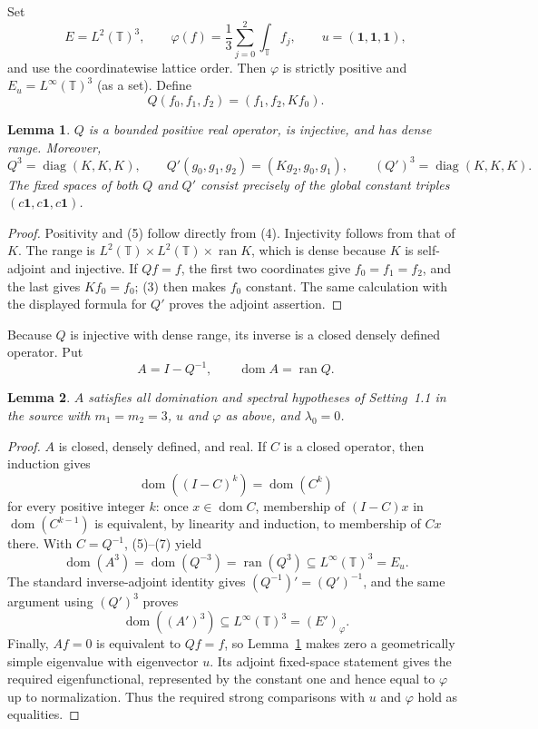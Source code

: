 \documentclass[11pt]{article}
\newtheorem{lemma}{Lemma}
\theoremstyle{remark}
\newcommand{\T}{\mathbb T}
\newcommand{\one}{\mathbf 1}
\newcommand{\ran}{\operatorname{ran}}
\newcommand{\dom}{\operatorname{dom}}
\begin{document}
Set
\[
 E=L^2(\T)^3,
 \qquad
 \varphi(f)=\frac13\sum_{j=0}^2\int_\T f_j,
 \qquad u=(\one,\one,\one),
\]
and use the coordinatewise lattice order.  Then $\varphi$ is strictly
positive and $E_u=L^\infty(\T)^3$ (as a set).  Define
\[
 Q(f_0,f_1,f_2)=(f_1,f_2,Kf_0).                             \tag{4}
\]

\begin{lemma}\label{lem:Q}
$Q$ is a bounded positive real operator, is injective, and has dense range.
Moreover,
\[
 Q^3=\operatorname{diag}(K,K,K),
 \qquad
 Q'(g_0,g_1,g_2)=(Kg_2,g_0,g_1),
 \qquad
 (Q')^3=\operatorname{diag}(K,K,K).                         \tag{5}
\]
The fixed spaces of both $Q$ and $Q'$ consist precisely of the global
constant triples $(c\one,c\one,c\one)$.
\end{lemma}

\begin{proof}
Positivity and (5) follow directly from (4).  Injectivity follows from that of
$K$.  The range is $L^2(\T)\times L^2(\T)\times\ran K$, which is dense
because $K$ is self-adjoint and injective.  If $Qf=f$, the first two
coordinates give $f_0=f_1=f_2$, and the last gives $Kf_0=f_0$; (3) then makes
$f_0$ constant.  The same calculation with the displayed formula for $Q'$
proves the adjoint assertion.
\end{proof}

Because $Q$ is injective with dense range, its inverse is a closed densely
defined operator.  Put
\[
 A=I-Q^{-1},\qquad \dom A=\ran Q.                           \tag{6}
\]

\begin{lemma}\label{lem:hyp}
$A$ satisfies all domination and spectral hypotheses of Setting~1.1 in the
source with $m_1=m_2=3$, $u$ and $\varphi$ as above, and $\lambda_0=0$.
\end{lemma}

\begin{proof}
$A$ is closed, densely defined, and real.  If $C$ is a closed operator, then
induction gives
\[
 \dom((I-C)^k)=\dom(C^k)                                   \tag{7}
\]
for every positive integer $k$: once $x\in\dom C$, membership of
$(I-C)x$ in $\dom(C^{k-1})$ is equivalent, by linearity and induction, to
membership of $Cx$ there.  With $C=Q^{-1}$, (5)--(7) yield
\[
 \dom(A^3)=\dom(Q^{-3})=\ran(Q^3)
 \subseteq L^\infty(\T)^3=E_u.                             \tag{8}
\]
The standard inverse-adjoint identity gives
$(Q^{-1})'=(Q')^{-1}$, and the same argument using $(Q')^3$ proves
\[
 \dom((A')^3)\subseteq L^\infty(\T)^3=(E')_\varphi.        \tag{9}
\]
Finally, $Af=0$ is equivalent to $Qf=f$, so Lemma~\ref{lem:Q} makes zero a
geometrically simple eigenvalue with eigenvector $u$.  Its adjoint fixed-space
statement gives the required eigenfunctional, represented by the constant
one and hence equal to $\varphi$ up to normalization.  Thus the required
strong comparisons with $u$ and $\varphi$ hold as equalities.
\end{proof}
\end{document}
